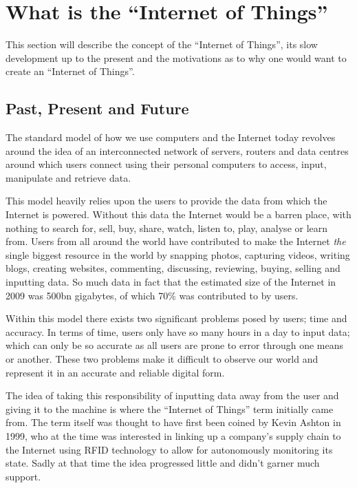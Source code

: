 \section{What is the ``Internet of Things''} %
\label{sec:internet_of_things_paradigm}
This section will describe the concept of the ``Internet of Things'', its slow development up to the present and the motivations as to why one would want to create an ``Internet of Things''.

\subsection{Past, Present and Future} %
\label{sub:past_present_and_future}

The standard model of how we use computers and the Internet today revolves around the idea of an interconnected network of servers, routers and data centres around which users connect using their personal computers to access, input, manipulate and retrieve data. 

This model heavily relies upon the users to provide the data from which the Internet is powered. Without this data the Internet would be a barren place, with nothing to search for, sell, buy, share, watch, listen to, play, analyse or learn from.
Users from all around the world have contributed to make the Internet \textit{the} single biggest resource in the world by snapping photos, capturing videos, writing blogs, creating websites, commenting, discussing, reviewing, buying, selling and inputting data. So much data in fact that the estimated size of the Internet in 2009 was 500bn gigabytes, of which 70\% was contributed to by users.\cite{Size}   

Within this model there exists two significant problems posed by users; time and accuracy. In terms of time, users only have so many hours in a day to input data; which can only be so accurate as all users are prone to error through one means or another.
These two problems make it difficult to observe our world and represent it in an accurate and reliable digital form.

The idea of taking this responsibility of inputting data away from the user and giving it to the machine is where the ``Internet of Things'' term initially came from. The term itself was thought to have first been coined by Kevin Ashton\cite{K.Ashton} in 1999, who at the time was interested in linking up a company's supply chain to the Internet using RFID technology to allow for autonomously monitoring its state.
Sadly at that time the idea progressed little and didn't garner much support.

